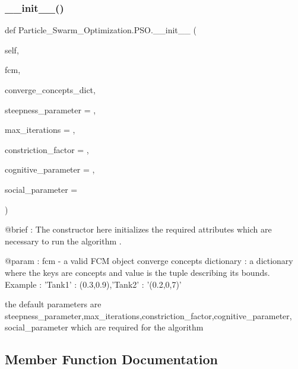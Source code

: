 \subsubsection{\texorpdfstring{\+\_\+\+\_\+init\+\_\+\+\_\+()}{\_\_init\_\_()}}
{\footnotesize\ttfamily def Particle\+\_\+\+Swarm\+\_\+\+Optimization.\+P\+S\+O.\+\_\+\+\_\+init\+\_\+\+\_\+ (\begin{DoxyParamCaption}\item[{}]{self,  }\item[{}]{fcm,  }\item[{}]{converge\+\_\+concepts\+\_\+dict,  }\item[{}]{steepness\+\_\+parameter = {},  }\item[{}]{max\+\_\+iterations = {},  }\item[{}]{constriction\+\_\+factor = {},  }\item[{}]{cognitive\+\_\+parameter = {},  }\item[{}]{social\+\_\+parameter = {} }\end{DoxyParamCaption})}

\begin{DoxyVerb}@brief : The constructor here initializes the required attributes which are necessary to run the algorithm .

@param : fcm - a valid FCM object
     converge concepts dictionary : a dictionary where the keys are concepts and value is the
     tuple describing its bounds. Example : {'Tank1' : (0.3,0.9),'Tank2' : '(0.2,0,7)'}

     the default parameters are steepness_parameter,max_iterations,constriction_factor,cognitive_parameter,
     social_parameter which are required for the algorithm\end{DoxyVerb}
 

\subsection{Member Function Documentation}
\hypertarget{class_particle___swarm___optimization_1_1_p_s_o_a26c6af0753a8c0508b2f3d1a727537a7}{}\label{class_particle___swarm___optimization_1_1_p_s_o_a26c6af0753a8c0508b2f3d1a727537a7} 
